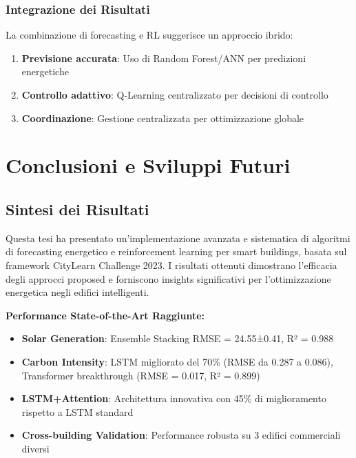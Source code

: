 \documentclass[12pt,a4paper,twoside]{report}
\begin{document}
\subsection{Integrazione dei Risultati}

La combinazione di forecasting e RL suggerisce un approccio ibrido:
\begin{enumerate}
    \item \textbf{Previsione accurata}: Uso di Random Forest/ANN per predizioni energetiche
    \item \textbf{Controllo adattivo}: Q-Learning centralizzato per decisioni di controllo
    \item \textbf{Coordinazione}: Gestione centralizzata per ottimizzazione globale
\end{enumerate}


\chapter{Conclusioni e Sviluppi Futuri}

\section{Sintesi dei Risultati}

Questa tesi ha presentato un'implementazione avanzata e sistematica di algoritmi di forecasting energetico e reinforcement learning per smart buildings, basata sul framework CityLearn Challenge 2023. I risultati ottenuti dimostrano l'efficacia degli approcci proposed e forniscono insights significativi per l'ottimizzazione energetica negli edifici intelligenti.

\textbf{Performance State-of-the-Art Raggiunte:}
\begin{itemize}
    \item \textbf{Solar Generation}: Ensemble Stacking RMSE = 24.55±0.41, R² = 0.988
    \item \textbf{Carbon Intensity}: LSTM migliorato del 70\% (RMSE da 0.287 a 0.086), Transformer breakthrough (RMSE = 0.017, R² = 0.899)
    \item \textbf{LSTM+Attention}: Architettura innovativa con 45\% di miglioramento rispetto a LSTM standard
    \item \textbf{Cross-building Validation}: Performance robusta su 3 edifici commerciali diversi
\end{itemize}
\end{document}
